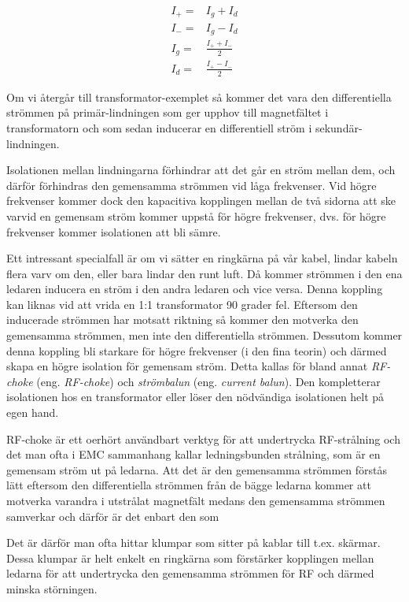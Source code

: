 \begin{eqnarray}
I_+ = & I_g + I_d\\
I_- = & I_g - I_d\\
I_g = & \frac{I_+ + I_-}{2}\\
I_d = & \frac{I_+ - I_-}{2}
\end{eqnarray}

Om vi återgår till transformator-exemplet så kommer det vara den differentiella
strömmen på primär-lindningen som ger upphov till magnetfältet i transformatorn
och som sedan inducerar en differentiell ström i sekundär-lindningen.

Isolationen mellan lindningarna förhindrar att det går en ström mellan dem,
och därför förhindras den gemensamma strömmen vid låga frekvenser. Vid högre
frekvenser kommer dock den kapacitiva kopplingen mellan de två sidorna att
ske varvid en gemensam ström kommer uppstå för högre frekvenser, dvs. för
högre frekvenser kommer isolationen att bli sämre.

Ett intressant specialfall är om vi sätter en ringkärna på vår kabel, lindar
kabeln flera varv om den, eller bara lindar den runt luft. Då kommer strömmen
i den ena ledaren inducera en ström i den andra ledaren och vice versa.
Denna koppling kan liknas vid att vrida en 1:1 transformator 90 grader fel.
Eftersom den inducerade strömmen har motsatt riktning så kommer den motverka
den gemensamma strömmen, men inte den differentiella strömmen. Dessutom kommer
denna koppling bli starkare för högre frekvenser (i den fina teorin) och
därmed skapa en högre isolation för gemensam ström. Detta kallas för
bland annat \emph{RF-choke} (eng. \emph{RF-choke}) och \emph{strömbalun} (eng.
\emph{current balun}). Den kompletterar isolationen hos en transformator
eller löser den nödvändiga isolationen helt på egen hand.

RF-choke är ett oerhört användbart verktyg för att undertrycka RF-strålning
och det man ofta i EMC sammanhang kallar ledningsbunden strålning, som är en
gemensam ström ut på ledarna. Att det är den gemensamma strömmen förstås lätt
eftersom den differentiella strömmen från de bägge ledarna kommer att motverka
varandra i utstrålat magnetfält medans den gemensamma strömmen samverkar och
därför är det enbart den som 

Det är därför man ofta hittar klumpar som sitter
på kablar till t.ex. skärmar. Dessa klumpar är helt enkelt en ringkärna som
förstärker kopplingen mellan ledarna för att undertrycka den gemensamma strömmen
för RF och därmed minska störningen.

